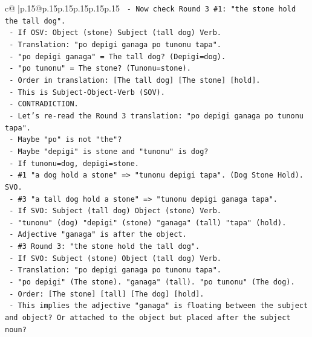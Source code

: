 \documentclass{article}
\begin{document}
{\begin{supertabular}{c@{$\;$}|p{.15\linewidth}@{}p{.15\linewidth}p{.15\linewidth}p{.15\linewidth}p{.15\linewidth}p{.15\linewidth}}
{{{\texttt{          {-} Now check Round 3 \#1: "the stone hold the tall dog".} \\
\texttt{          {-} If OSV: Object (stone) Subject (tall dog) Verb.} \\
\texttt{          {-} Translation: "po depigi ganaga po tunonu tapa".} \\
\texttt{          {-} "po depigi ganaga" = The tall dog? (Depigi=dog).} \\
\texttt{          {-} "po tunonu" = The stone? (Tunonu=stone).} \\
\texttt{          {-} Order in translation: {[}The tall dog{]} {[}The stone{]} {[}hold{]}.} \\
\texttt{          {-} This is Subject{-}Object{-}Verb (SOV).} \\
\texttt{          {-} CONTRADICTION.} \\
\texttt{          {-} Let's re{-}read the Round 3 translation: "po depigi ganaga po tunonu tapa".} \\
\texttt{          {-} Maybe "po" is not "the"?} \\
\texttt{          {-} Maybe "depigi" is stone and "tunonu" is dog?} \\
\texttt{            {-} If tunonu=dog, depigi=stone.} \\
\texttt{            {-} \#1 "a dog hold a stone" => "tunonu depigi tapa". (Dog Stone Hold). SVO.} \\
\texttt{            {-} \#3 "a tall dog hold a stone" => "tunonu depigi ganaga tapa".} \\
\texttt{              {-} If SVO: Subject (tall dog) Object (stone) Verb.} \\
\texttt{              {-} "tunonu" (dog) "depigi" (stone) "ganaga" (tall) "tapa" (hold).} \\
\texttt{              {-} Adjective "ganaga" is after the object.} \\
\texttt{            {-} \#3 Round 3: "the stone hold the tall dog".} \\
\texttt{              {-} If SVO: Subject (stone) Object (tall dog) Verb.} \\
\texttt{              {-} Translation: "po depigi ganaga po tunonu tapa".} \\
\texttt{              {-} "po depigi" (The stone). "ganaga" (tall). "po tunonu" (The dog).} \\
\texttt{              {-} Order: {[}The stone{]} {[}tall{]} {[}The dog{]} {[}hold{]}.} \\
\texttt{              {-} This implies the adjective "ganaga" is floating between the subject and object? Or attached to the object but placed after the subject noun?} \\
}}}
\end{supertabular}}
\end{document}
